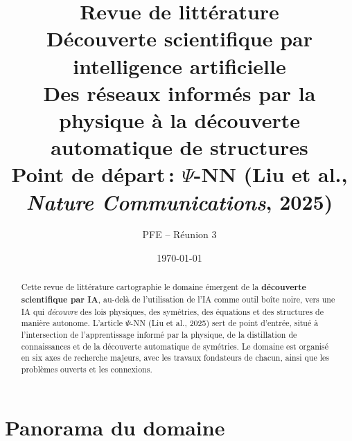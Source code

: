 \documentclass[11pt,a4paper]{article}
\title{\textbf{Revue de littérature}\\[4pt]
\Large Découverte scientifique par intelligence artificielle\\[4pt]
\large Des réseaux informés par la physique à la découverte automatique de structures\\[6pt]
\normalsize Point de départ\,: $\Psi$-NN (Liu et al., \textit{Nature Communications}, 2025)}
\author{PFE -- Réunion 3}
\date{\today}
\begin{document}
\maketitle

\begin{abstract}
\noindent Cette revue de littérature cartographie le domaine émergent de la \textbf{découverte scientifique par IA}, au-delà de l'utilisation de l'IA comme outil boîte noire, vers une IA qui \emph{découvre} des lois physiques, des symétries, des équations et des structures de manière autonome. L'article $\Psi$-NN (Liu et al., 2025) sert de point d'entrée, situé à l'intersection de l'apprentissage informé par la physique, de la distillation de connaissances et de la découverte automatique de symétries. Le domaine est organisé en six axes de recherche majeurs, avec les travaux fondateurs de chacun, ainsi que les problèmes ouverts et les connexions.
\end{abstract}

\tableofcontents
\newpage

\section{Panorama du domaine}
\end{document}
